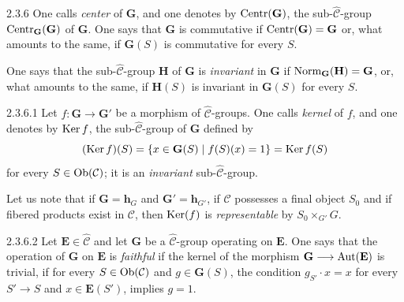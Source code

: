 \begin{definition}{2.3.6}\label{I.2.3.6}
One calls \emph{center} of \(\mathbf{G}\), and one denotes by
\(\operatorname{Centr}(\mathbf{G})\), the sub-\(\widehat{\mathcal{C}}\)-group
\(\operatorname{Centr}_{\mathbf{G}}(\mathbf{G})\) of \(\mathbf{G}\). One says that
\(\mathbf{G}\) is commutative if \(\operatorname{Centr}(\mathbf{G})=\mathbf{G}\) or, what
amounts to the same, if \(\mathbf{G}(S)\) is commutative for every \(S\).

One says that the sub-\(\widehat{\mathcal{C}}\)-group \(\mathbf{H}\) of
\(\mathbf{G}\) is \emph{invariant} in \(\mathbf{G}\) if
\(\operatorname{Norm}_{\mathbf{G}}(\mathbf{H})=\mathbf{G}\), or, what amounts to the same,
if \(\mathbf{H}(S)\) is invariant in \(\mathbf{G}(S)\) for every \(S\).
\end{definition}

\begin{definition}{2.3.6.1}\label{I.2.3.6.1}
Let \(f\colon\mathbf{G}\to\mathbf{G}'\) be a morphism of
\(\widehat{\mathcal{C}}\)-groups. One calls \emph{kernel} of \(f\), and one
denotes by \(\operatorname{Ker} f\), the sub-\(\widehat{\mathcal{C}}\)-group of
\(\mathbf{G}\) defined by
\[
(\operatorname{Ker} f)(S)
=\{x\in\mathbf{G}(S)\mid f(S)(x)=1\}
=\operatorname{Ker} f(S)
\]
for every \(S\in\operatorname{Ob}(\mathcal{C})\); it is an \emph{invariant}
sub-\(\widehat{\mathcal{C}}\)-group.

Let us note that if \(\mathbf{G}=\mathbf{h}_{G}\) and
\(\mathbf{G}'=\mathbf{h}_{G'}\), if \(\mathcal{C}\) possesses a final
object \(S_{0}\) and if fibered products exist in \(\mathcal{C}\), then
\(\operatorname{Ker}(f)\) is \emph{representable} by
\(S_{0}\times_{G'}G\).
\end{definition}

\begin{definition}{2.3.6.2}\label{I.2.3.6.2}
\footnotemark[26]
Let \(\mathbf{E}\in\widehat{\mathcal{C}}\) and let \(\mathbf{G}\) be a
\(\widehat{\mathcal{C}}\)-group operating on \(\mathbf{E}\). One says that
the operation of \(\mathbf{G}\) on \(\mathbf{E}\) is \emph{faithful} if the
kernel of the morphism \(\mathbf{G}\longrightarrow\operatorname{Aut}(\mathbf{E})\) is trivial, \ie if
for every \(S\in\operatorname{Ob}(\mathcal{C})\) and \(g\in\mathbf{G}(S)\), the condition
\(g_{S'}\cdot x=x\) for every \(S'\to S\) and \(x\in\mathbf{E}(S')\), implies
\(g=1\).
\end{definition}

